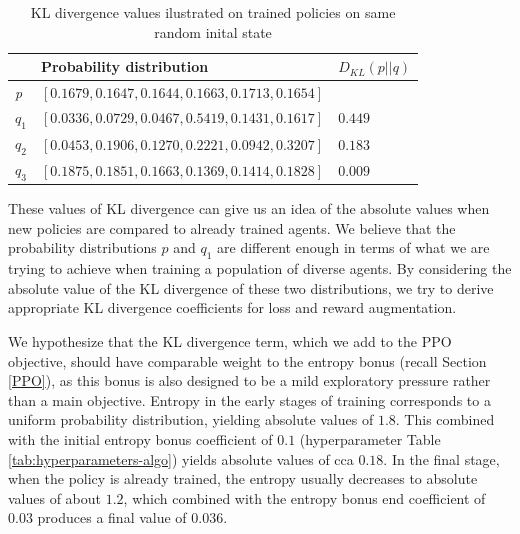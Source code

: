 \begin{table}[htbp]
    \small
    \centering
    \begin{tabular}{lll}
      \toprule
      \                                & Probability distribution     & $D_{KL}(p||q)$         \\ \midrule
      \textit{p}     &$[0.1679, 0.1647, 0.1644, 0.1663, 0.1713, 0.1654]$                                   &                                   \\ \midrule            
      $q_1$                     & $[0.0336, 0.0729, 0.0467, 0.5419, 0.1431, 0.1617]$                            & $0.449$                            \\
      $q_2$                         & $[0.0453, 0.1906, 0.1270, 0.2221, 0.0942, 0.3207]$                            & $0.183$                            \\
      $q_3$                                & $[0.1875, 0.1851, 0.1663, 0.1369, 0.1414, 0.1828]$                         & $0.009$                               \\
      
     \bottomrule
    \end{tabular}
    \caption{KL divergence values ilustrated on trained policies on same random inital state}
    \label{tab:KLDiv-distributions}
\end{table}

These values of KL divergence can give us an idea of the absolute values when new policies are compared to already trained agents.
We believe that the probability distributions $p$ and $q_1$ are different enough in terms of what we are trying to achieve when training a population of diverse agents.
By considering the absolute value of the KL divergence of these two distributions, we try to derive appropriate KL divergence coefficients for loss and reward augmentation.

We hypothesize that the KL divergence term, which we add to the PPO objective, should have comparable weight to the entropy bonus (recall Section \ref{PPO}), as this bonus is also designed to be a mild exploratory pressure rather than a main objective.
Entropy in the early stages of training corresponds to a uniform probability distribution, yielding absolute values of $1.8$. 
This combined with the initial entropy bonus coefficient of $0.1$ (hyperparameter Table \ref{tab:hyperparameters-algo}) yields absolute values of cca $0.18$.
In the final stage, when the policy is already trained, the entropy usually decreases to absolute values of about $1.2$, which combined with the entropy bonus end coefficient of $0.03$ produces a final value of $0.036$.

